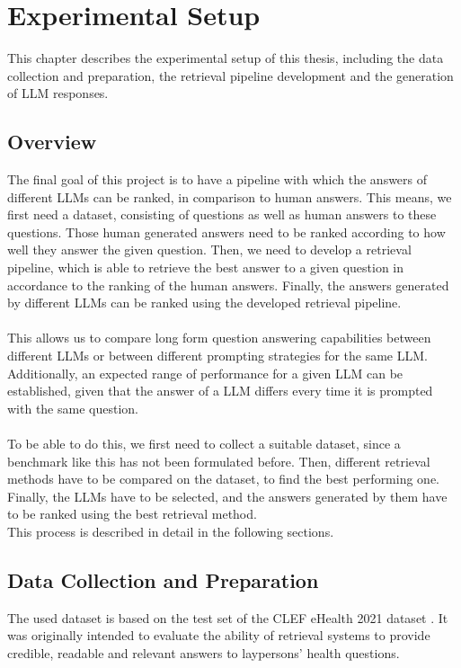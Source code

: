 \chapter{Experimental Setup}
This chapter describes the experimental setup of this thesis, including the data collection and preparation, the retrieval pipeline development and the generation of LLM responses.

\section{Overview}\label{sec:overview}
The final goal of this project is to have a pipeline with which the answers of different LLMs can be ranked, in comparison to human answers.
This means, we first need a dataset, consisting of questions as well as human answers to these questions.
Those human generated answers need to be ranked according to how well they answer the given question.
Then, we need to develop a retrieval pipeline, which is able to retrieve the best answer to a given question in accordance to the ranking of the human answers.
Finally, the answers generated by different LLMs can be ranked using the developed retrieval pipeline.
\\\\
This allows us to compare long form question answering capabilities between different LLMs or between different prompting strategies for the same LLM.
Additionally, an expected range of performance for a given LLM can be established, given that the answer of a LLM differs every time it is prompted with the same question.
\\\\
To be able to do this, we first need to collect a suitable dataset, since a benchmark like this has not been formulated before.
Then, different retrieval methods have to be compared on the dataset, to find the best performing one.
Finally, the LLMs have to be selected, and the answers generated by them have to be ranked using the best retrieval method.
\\
This process is described in detail in the following sections.

\section{Data Collection and Preparation}\label{sec:dataset}
The used dataset is based on the test set of the CLEF eHealth 2021 dataset \cite{goeuriot:2021}.
It was originally intended to evaluate the ability of retrieval systems to provide credible, readable and relevant answers to laypersons' health questions.


